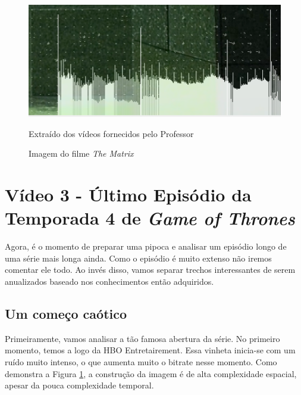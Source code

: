 \begin{figure}[H]
    \centering
    \caption{Imagem do filme \textit{The Matrix}}
    \label{fig:imagem12}
    
    \includegraphics[scale=1]{Documeto/1-ElementosTextuais/images/12.png}

    \small
    Extraído dos vídeos fornecidos pelo Professor
\end{figure}


\section{Vídeo 3 - Último Episódio da Temporada 4 de \textit{Game of Thrones}}
Agora, é o momento de preparar uma pipoca e analisar um episódio longo de uma série mais longa ainda. Como o episódio é muito extenso não iremos comentar ele todo. Ao invés disso, vamos separar trechos interessantes de serem anualizados baseado nos conhecimentos então adquiridos.


\subsection{Um começo caótico}
Primeiramente, vamos analisar a tão famosa abertura da série. No primeiro momento, temos a logo da HBO Entretairement. Essa vinheta inicia-se com um ruído muito intenso, o que aumenta muito o bitrate nesse momento. Como demonstra a Figura \ref{fig:imagem12}, a construção da imagem é de alta complexidade espacial, apesar da pouca complexidade temporal.

